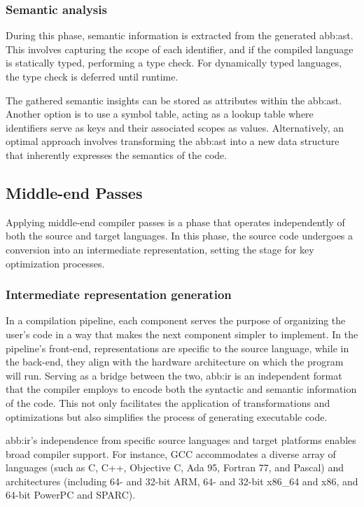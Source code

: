         \subsubsection{Semantic analysis} 
            During this phase, semantic information is extracted from the generated \gls{abb:ast}. This involves capturing the scope of each identifier, and if the compiled language is statically typed, performing a type check. For dynamically typed languages, the type check is deferred until runtime.

            The gathered semantic insights can be stored as attributes within the \gls{abb:ast}. Another option is to use a symbol table, acting as a lookup table where identifiers serve as keys and their associated scopes as values. Alternatively, an optimal approach involves transforming the \gls{abb:ast} into a new data structure that inherently expresses the semantics of the code.

            

    \subsection{Middle-end Passes}
        Applying middle-end compiler passes is a phase that operates independently of both the source and target languages. In this phase, the source code undergoes a conversion into an intermediate representation, setting the stage for key optimization processes. 

        \subsubsection{Intermediate representation generation}

            In a compilation pipeline, each component serves the purpose of organizing the user's code in a way that makes the next component simpler to implement. In the pipeline's front-end, representations are specific to the source language, while in the back-end, they align with the hardware architecture on which the program will run. Serving as a bridge between the two, \gls{abb:ir} is an independent format that the compiler employs to encode both the syntactic and semantic information of the code. This not only facilitates the application of transformations and optimizations but also simplifies the process of generating executable code.

            \gls{abb:ir}'s independence from specific source languages and target platforms enables broad compiler support. For instance, GCC accommodates a diverse array of languages (such as C, C++, Objective C, Ada 95, Fortran 77, and Pascal) and architectures (including 64- and 32-bit ARM, 64- and 32-bit x86\_64 and x86, and 64-bit PowerPC and SPARC).

